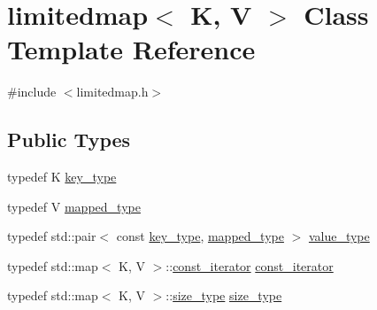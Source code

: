 \hypertarget{classlimitedmap}{}\section{limitedmap$<$ K, V $>$ Class Template Reference}
\label{classlimitedmap}


{\ttfamily \#include $<$limitedmap.\+h$>$}

\subsection*{Public Types}
\begin{DoxyCompactItemize}
\item 
typedef K \hyperlink{classlimitedmap_aebf71255c65df699225cdcefe88717b9}{key\+\_\+type}
\item 
typedef V \hyperlink{classlimitedmap_a8bd6b8e7f91f0a141c91c382b492c03c}{mapped\+\_\+type}
\item 
typedef std\+::pair$<$ const \hyperlink{classlimitedmap_aebf71255c65df699225cdcefe88717b9}{key\+\_\+type}, \hyperlink{classlimitedmap_a8bd6b8e7f91f0a141c91c382b492c03c}{mapped\+\_\+type} $>$ \hyperlink{classlimitedmap_a8a6c4972e628b71bf43eeb757dafdce5}{value\+\_\+type}
\item 
typedef std\+::map$<$ K, V $>$\+::\hyperlink{classlimitedmap_ab0a3e4f2ec7c82359300c83a35ae2500}{const\+\_\+iterator} \hyperlink{classlimitedmap_ab0a3e4f2ec7c82359300c83a35ae2500}{const\+\_\+iterator}
\item 
typedef std\+::map$<$ K, V $>$\+::\hyperlink{classlimitedmap_a1c564b323f94e182e56aa27975e5f9d1}{size\+\_\+type} \hyperlink{classlimitedmap_a1c564b323f94e182e56aa27975e5f9d1}{size\+\_\+type}
\end{DoxyCompactItemize}
